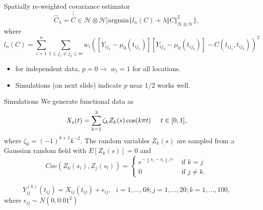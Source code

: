 \documentclass{beamer}
\renewcommand{\H}{\mathcal{H}}
\newcommand{\norm}[1]{\left\|#1\right\|}
\begin{document}
\begin{frame}[t]{Spatially re-weighted covariance estimator}
	\begin{equation*}
	\hat{C}_{\lambda}=\stackrel[C \in \H\otimes\H]{}{\mbox{argmin}} \{l_{n}(C)+\lambda\left\Vert C\right\Vert _{\H\otimes \H}^{2}\},
	\end{equation*}
	 where
	\begin{equation*}
	l_{n}(C)=\sum_{i=1}^{n}\sum_{1\leq j_{1}\neq j_{2}\leq m}w_i([Y_{ij_{1}}-\mu_{0}(t_{ij_1})][Y_{ij_{2}}-\mu_{0}(t_{ij_{2}})]-C(t_{ij_{1}},t_{ij_{2}}))^{2}
	\end{equation*}
	\begin{itemize}
	\item for independent data, $p = 0 \rightarrow$ $w_i = 1$ for all locations.
	\item Simulations (on next slide) indicate $p$ near $1/2$ works well.
	\end{itemize}
\end{frame}


\begin{frame}[t]{Simulations}
	We generate functional data as
	\begin{equation*}
		X_s(t) = \sum^{3}_{k=1}\zeta_k Z_k(s) \cos(k\pi t) \hspace{0.5cm} t \in [0,1],
		\label{eq:sim process2}
	\end{equation*}
	where \(\zeta_k=(-1)^{k+1}k^{-2}\). The random variables $Z_k(s)$ are sampled from a Gaussian random field with $E[Z_k(s)]=0$ and
	\begin{equation*}
		Cov(Z_k(s_i), Z_j(s_l)) = \begin{cases}
																	e^{-\norm{s_i - s_l}/r} &\mbox{ if } k = j\\
																	0 & \mbox{ if } j \neq k.
																\end{cases}
	\end{equation*}

	\begin{equation*}
		Y^{(k)}_{ij}(t_{ij}) = X_{ij}(t_{ij}) + \epsilon_{ij}, \mbox{ } i = 1, \dots, 68; j = 1, \dots, 20; k = 1, \dots, 100,
	\end{equation*}
	where $\epsilon_{ij} \sim N(0, 0.01^2)$


\end{frame}
\end{document}
